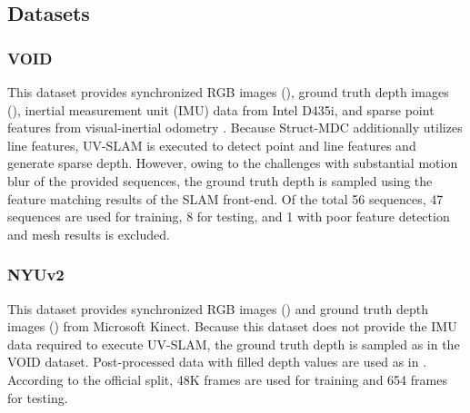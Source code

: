 \subsection{\textcolor{color2}{Datasets}}
\subsubsection{VOID}
This dataset provides synchronized RGB images (), ground truth depth images (), inertial measurement unit (IMU) data from Intel D435i, and sparse point features from visual-inertial odometry \cite{xivo}. 
\textcolor{color1}{Because} Struct-MDC additionally utilizes line features, UV-SLAM \cite{uvslsam} is executed to detect point and line features \textcolor{color1}{and} generate sparse depth. However, \textcolor{color1}{owing} to the challeng\textcolor{color1}{es} with substantial motion blur of the provided sequences, \textcolor{color1}{the} ground truth depth is sampled using the feature matching results of the SLAM front-end.
Of the total 56 sequences, 47 sequences are used for training, \textcolor{color1}{8 for testing, and 1} with poor feature detection and mesh results is excluded.


\subsubsection{NYUv2}
This dataset provides synchronized RGB images () and ground truth depth images () from Microsoft Kinect. 
\textcolor{color1}{Because} this dataset does not provide the IMU data required to execute UV-SLAM, the ground truth depth is sampled as in the VOID dataset.
Post-processed data with filled depth values \textcolor{color1}{are} used as in \cite{s2d}. According to the official split, 48K frames are used for training \textcolor{color1}{and 654 frames} for testing.



